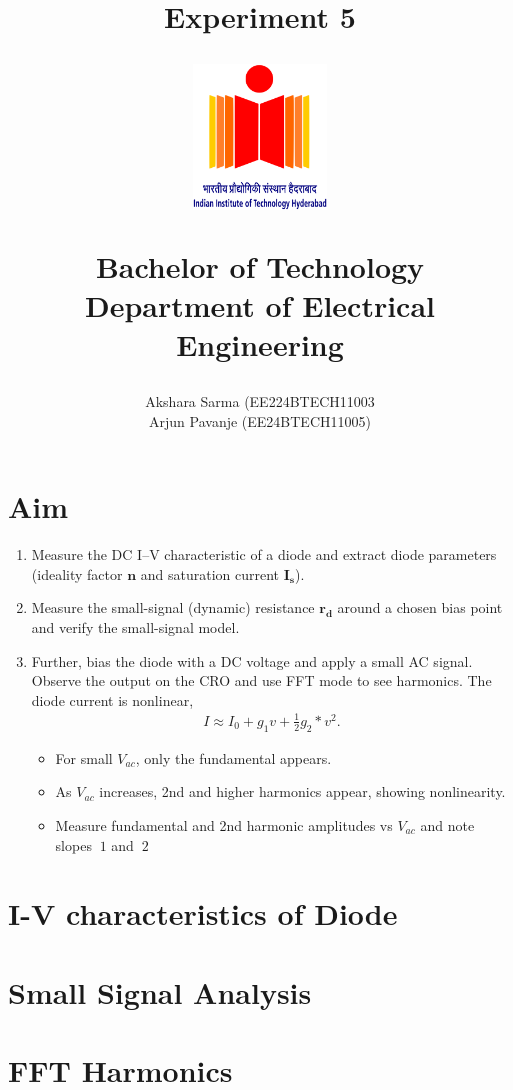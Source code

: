 \documentclass[12pt,a4paper]{report}
\begin{document}
\title{\textbf{Experiment 5}\\
\LARGE{\textbf{ }}
\author{Akshara Sarma (EE224BTECH11003 \\ Arjun Pavanje (EE24BTECH11005)}

\begin{center}
\end{center}
\vspace{30pt}
\begin{figure}[ht]
	\centering
	\includegraphics[width = 100pt]{logo.png}\\
\end{figure}
\begin{center}
	Bachelor of Technology\\
	\vspace{10pt}
	Department of Electrical Engineering\\
\end{center}
}
\maketitle
\section{Aim}
\begin{enumerate}
\item Measure the DC I–V characteristic of a diode and extract diode parameters (ideality factor $\mathbf{n}$ and saturation current $\mathbf{I_s}$). 
\item Measure the small-signal (dynamic) resistance $\mathbf{r_d}$ around a chosen bias point and verify the small-signal model. 
\item Further, bias the diode with a DC voltage and apply a small AC signal. Observe the output on the CRO and use FFT mode to see harmonics. The diode current is nonlinear,
\begin{align*}
I \approx I_0 + g_1v + \frac{1}{2}g_2*v^2.
\end{align*}
\begin{itemize}
\item For small $V_{ac}$, only the fundamental appears. 
\item As $V_{ac}$ increases, 2nd and higher harmonics appear, showing nonlinearity. 
\item Measure fundamental and 2nd harmonic amplitudes vs $V_{ac}$ and note slopes $~1$ and $~2$
\end{itemize}
\end{enumerate}
\section{I-V characteristics of Diode}
\section{Small Signal Analysis}
\section{FFT Harmonics}
\end{document}
